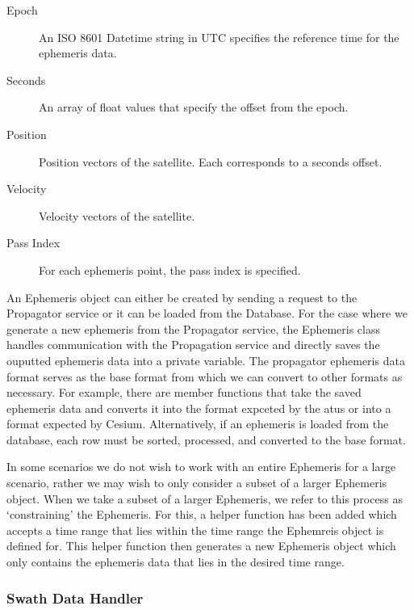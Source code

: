 \begin{description}

    \item[Epoch] An ISO 8601 Datetime string in UTC specifies the reference
	time for the ephemeris data.

    \item[Seconds] An array of float values that specify the offset from the
	epoch.

    \item[Position] Position vectors of the satellite. Each corresponds to a
	seconds offset.

    \item[Velocity] Velocity vectors of the satellite. 

    \item[Pass Index] For each ephemeris point, the pass index is specified. 

\end{description}


An Ephemeris object can either be created by sending a request to the
Propagator service or it can be loaded from the Database. For the case where we
generate a new ephemeris from the Propagator service, the Ephemeris class
handles communication with the Propagation service and directly saves the
ouputted ephemeris data into a private variable. The propagator ephemeris data
format serves as the base format from which we can convert to other formats as
necessary. For example, there are member functions that take the saved
ephemeris data and converts it into the format expceted by the \glspl{atu} or
into a format expected by Cesium. Alternatively, if an ephemeris is loaded from
the database, each row must be sorted, processed, and converted to the base
format. 

In some scenarios we do not wish to work with an entire Ephemeris for a large
scenario, rather we may wish to only consider a subset of a larger Ephemeris
object. When we take a subset of a larger Ephemeris, we refer to this process
as `constraining' the Ephemeris. For this, a helper function has been added
which accepts a time range that lies within the time range the Ephemreis object
is defined for. This helper function then generates a new Ephemeris object
which only contains the ephemeris data that lies in the desired time range.  
 
\subsubsection{Swath Data Handler}

